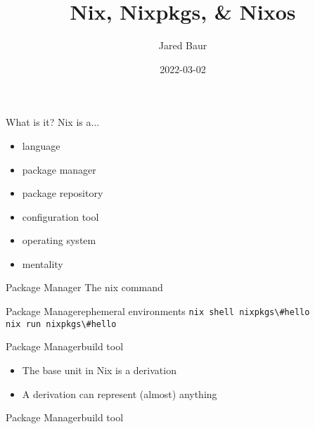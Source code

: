 \documentclass{beamer}
\title{Nix, Nixpkgs, \& Nixos}
\author{Jared Baur}
\date{2022-03-02}
\begin{document}
\lstset{language=Nix}

\begin{frame}
	\titlepage
\end{frame}

\begin{frame}{What is it?}
	Nix is a...
	\begin{itemize}
		\item language
		\item package manager
		\item package repository
		\item configuration tool
		\item operating system
		\item mentality
	\end{itemize}
\end{frame}

\begin{frame}{Package Manager}
	The nix command
\end{frame}

\begin{frame}{Package Manager}{ephemeral environments}
	\lstinline[language={}]!nix shell nixpkgs\#hello!
	\\
	\lstinline[language={}]!nix run nixpkgs\#hello!
\end{frame}

\begin{frame}[containsverbatim]{Package Manager}{build tool}
	\begin{itemize}
		\item The base unit in Nix is a derivation
		\item A derivation can represent (almost) anything
	\end{itemize}
	
\end{frame}

\begin{frame}[containsverbatim]{Package Manager}{build tool}
	
\end{frame}
\end{document}
